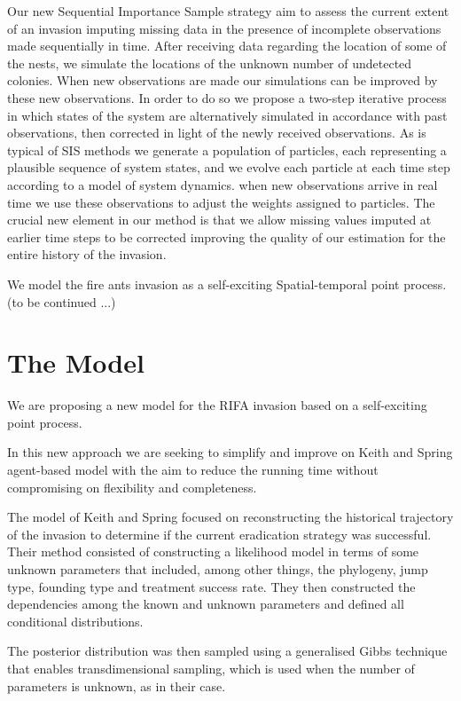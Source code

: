 \documentclass[11pt,a4paper]{article}
\begin{document}
{Our new Sequential Importance Sample strategy aim to assess the current extent of an invasion imputing missing data in the presence of incomplete observations made sequentially in time. After receiving data regarding the location of some of the nests, we simulate the locations of the unknown number of undetected colonies. When new observations are made our simulations can be improved by these new observations. In order to do so we propose a two-step iterative process in which states of the system are alternatively simulated in accordance with past observations, then corrected in light of the newly received observations. As is typical of SIS methods we generate a population of particles, each representing a plausible sequence of system states, and we evolve each particle at each time step according to a model of system dynamics. when new observations arrive in real time we use these observations to adjust the weights assigned to particles. The crucial new element in our method is that we allow missing values imputed at earlier time steps to be corrected improving the quality of our estimation for the entire history of the invasion.

We model the fire ants invasion as a self-exciting Spatial-temporal point process.  (to be continued ...)}


\section{The Model}\label{section:model}

We are proposing a new model for the RIFA invasion based on a self-exciting point process.

In this new approach we are seeking to simplify and improve on Keith and Spring agent-based model \cite{Keith} with the aim to reduce the running time without compromising on flexibility and completeness.

The model of Keith and Spring focused on reconstructing the historical trajectory of the invasion to determine if the current eradication strategy was successful. Their method consisted of constructing a likelihood model in terms of some unknown parameters that included, among other things, the phylogeny, jump type, founding type and treatment success rate. They then constructed the dependencies among the known and unknown parameters and defined all conditional distributions.

The posterior distribution was then sampled using a generalised Gibbs technique that enables transdimensional sampling, which is used when the number of parameters is unknown, as in their case.
\end{document}
